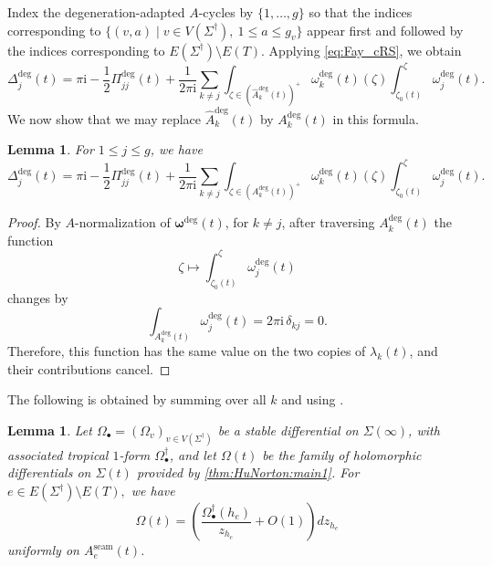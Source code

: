 \documentclass[12pt]{amsart}
\numberwithin{equation}{section}
\newtheorem{lemma}[theorem]{Lemma}
\theoremstyle{definition}
\def\vertices{V}
\def\edges{E}
\def\trop{\dagger}
\def\imunit{{\mathrm{i}}}
\def\RC{{\Delta}}
\def\ptSig{\zeta}
\def\basept{{\ptSig_0}}
\def\mcurve{\Sigma}
\def\tropmcurve{\mcurve^\trop}
\begin{document}
Index the degeneration-adapted $A$-cycles by $\{1,\dots,g\}$ so that
the indices corresponding to
$
\{
(v,a)
\mid
v\in\vertices(\tropmcurve),
\ 1\leq a\leq g_v
\}
$
appear first and followed by the indices corresponding to
$
\edges(\tropmcurve)\setminus\edges(T)
$. Applying \eqref{eq:Fay_cRS}, we obtain
\[
\RC_j^{\mathrm{deg}}(t)
=
\pi\imunit
-
\frac{1}{2}\Pi_{jj}^{\mathrm{deg}}(t)
+
\frac{1}{2\pi\imunit}
\sum_{k\neq j}
\int_{\zeta\in
(\widehat A_k^{\mathrm{deg}}(t))^+}
\omega_k^{\mathrm{deg}}(t)(\zeta)
\int_{\basept(t)}^\zeta
\omega_j^{\mathrm{deg}}(t).
\]
We now show that we may replace
$\widehat A_k^{\mathrm{deg}}(t)$ by $A_k^{\mathrm{deg}}(t)$ in this
formula.


\begin{lemma}
\label{lem:Fay_RC_deg}
For $1\leq j\leq g$, we have
\begin{equation}
\label{eq:Fay_RC_deg}
\RC_j^{\mathrm{deg}}(t)
=
\pi\imunit
-
\frac{1}{2}\Pi_{jj}^{\mathrm{deg}}(t)
+
\frac{1}{2\pi\imunit}
\sum_{k\neq j}
\int_{\zeta\in(A_k^{\mathrm{deg}}(t))^+}
\omega_k^{\mathrm{deg}}(t)(\zeta)
\int_{\basept(t)}^\zeta
\omega_j^{\mathrm{deg}}(t).
\end{equation}
\end{lemma}

\begin{proof}
By $A$-normalization of $\bm\omega^{\mathrm{deg}}(t)$, for $k\neq j$,
after traversing $A_k^{\mathrm{deg}}(t)$ the function
\[
\zeta
\mapsto
\int_{\basept(t)}^\zeta
\omega_j^{\mathrm{deg}}(t)
\]
changes by
\[
\int_{A_k^{\mathrm{deg}}(t)}
\omega_j^{\mathrm{deg}}(t)
=
2\pi\imunit\,\delta_{kj}
=
0.
\]
Therefore, this function has the same value on the two copies of
$\lambda_k(t)$, and their contributions cancel.
\end{proof}


The following is obtained by summing \cite[Eq.~(3.11)]{HuNorton} over all $k$ and using \cite[Lemma~3.2]{HuNorton}.

\begin{lemma}
\label{lem:estimate_on_seams}
Let $\Omega_\bullet=(\Omega_v)_{v\in\vertices(\tropmcurve)}$ be a stable
differential on $\mcurve(\infty)$, with associated tropical $1$-form
$\Omega_\bullet^\trop$, and let $\Omega(t)$ be the family of holomorphic
differentials on $\mcurve(t)$ provided by
\cref{thm:HuNorton:main1}. For
$
e\in\edges(\tropmcurve)\setminus\edges(T),
$
we have
\[
\Omega(t)
=
\left(
\frac{\Omega_\bullet^\trop(h_e)}{z_{h_e}}
+
O(1)
\right)
dz_{h_e}
\]
uniformly on $A_e^{\mathrm{seam}}(t)$.
\end{lemma}
\end{document}
